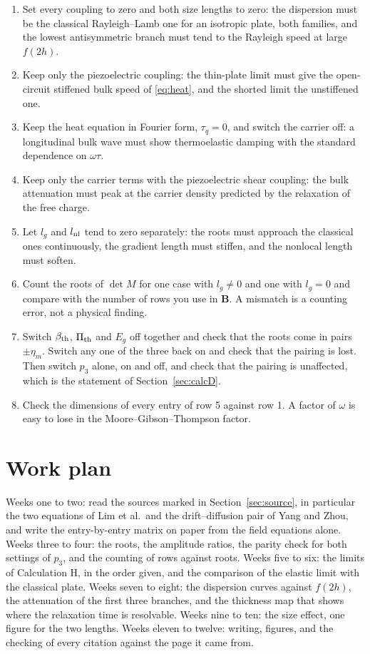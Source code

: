 \documentclass[11pt]{article}
\begin{document}
\begin{enumerate}
\item Set every coupling to zero and both size lengths to zero: the dispersion must be the classical
Rayleigh--Lamb one for an isotropic plate, both families, and the lowest antisymmetric branch must tend to
the Rayleigh speed at large $f(2h)$.
\item Keep only the piezoelectric coupling: the thin-plate limit must give the open-circuit stiffened bulk
speed of \eqref{eq:heat}, and the shorted limit the unstiffened one.
\item Keep the heat equation in Fourier form, $\tau_q=0$, and switch the carrier off: a longitudinal bulk
wave must show thermoelastic damping with the standard dependence on $\omega\tau$.
\item Keep only the carrier terms with the piezoelectric shear coupling: the bulk attenuation must peak at
the carrier density predicted by the relaxation of the free charge.
\item Let $l_g$ and $l_{\rm nl}$ tend to zero separately: the roots must approach the classical ones
continuously, the gradient length must stiffen, and the nonlocal length must soften.
\item Count the roots of $\det M$ for one case with $l_g\ne0$ and one with $l_g=0$ and compare with the
number of rows you use in $\mathbf B$. A mismatch is a counting error, not a physical finding.
\item Switch $\beta_{\rm th}$, $\Pi_{\rm th}$ and $E_g$ off together and check that the roots come in
pairs $\pm\eta_m$. Switch any one of the three back on and check that the pairing is lost. Then switch
$p_3$ alone, on and off, and check that the pairing is unaffected, which is the statement of
Section~\ref{sec:calcD}.
\item Check the dimensions of every entry of row 5 against row 1. A factor of $\omega$ is easy to lose
in the Moore--Gibson--Thompson factor.
\end{enumerate}

\section{Work plan}\label{sec:plan}

Weeks one to two: read the sources marked in Section~\ref{sec:source}, in particular the two equations of
Lim et al.\ and the drift--diffusion pair of Yang and Zhou, and write the entry-by-entry matrix on paper
from the field equations alone. Weeks three to four: the roots, the amplitude ratios, the parity check for
both settings of $p_3$, and the counting of rows against roots. Weeks five to six: the limits of
Calculation H, in the order given, and the comparison of the elastic limit with the classical plate.
Weeks seven to eight: the dispersion curves against $f(2h)$, the attenuation of the first three branches,
and the thickness map that shows where the relaxation time is resolvable. Weeks nine to ten: the size
effect, one figure for the two lengths. Weeks eleven to twelve: writing, figures, and the checking of every
citation against the page it came from.



\end{document}
